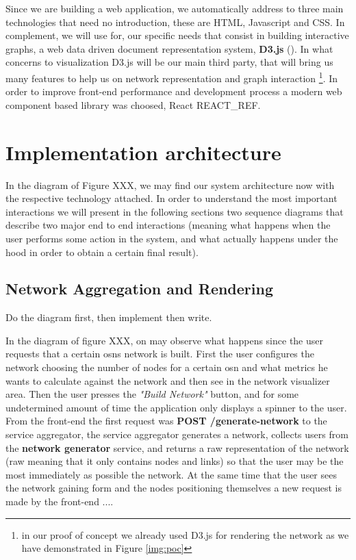 Since we are building a web application, we automatically address to three main technologies that need no introduction, these are HTML, Javascript and CSS. In complement, we will use for, our specific needs that consist in building interactive graphs, a web data driven document representation system, \textbf{D3.js} (\cite{bostock2012d3}). In what concerns to visualization D3.js will be our main third party, that will bring us many features to help us on network representation and graph interaction \footnote{in our proof of concept we already used D3.js for rendering the network as we have demonstrated in Figure \ref{img:poc}}. In order to improve front-end performance and development process a modern web component based library was choosed, React REACT\_REF.

\section{Implementation architecture}

In the diagram of Figure XXX, we may find our system architecture now with the respective technology attached. In order to understand the most important interactions we will present in the following sections two sequence diagrams that describe two major end to end interactions (meaning what happens when the user performs some action in the system, and what actually happens under the hood in order to obtain a certain final result).

\subsection{Network Aggregation and Rendering}

\begin{huge}
Do the diagram first, then implement then write.
\end{huge}
In the diagram of figure XXX, on may observe what happens since the user requests that a certain \glspl{osn} network is built.
First the user configures the network choosing the number of nodes for a certain \gls{osn} and what metrics he wants to calculate against the network
and then see in the network visualizer area. Then the user presses the \textit{"Build Network"} button, and for some undetermined amount of time
the application only displays a spinner to the user. From the front-end the first request was \textbf{POST /generate-network} to the service aggregator, the service aggregator generates a network, collects users from the \textbf{network generator} service, and returns a raw representation of the network (raw meaning that it only contains nodes and links) so that the user may be the most immediately as possible the network. At the same time that the user sees the network gaining form and the nodes positioning themselves a new request is made by the front-end ....

